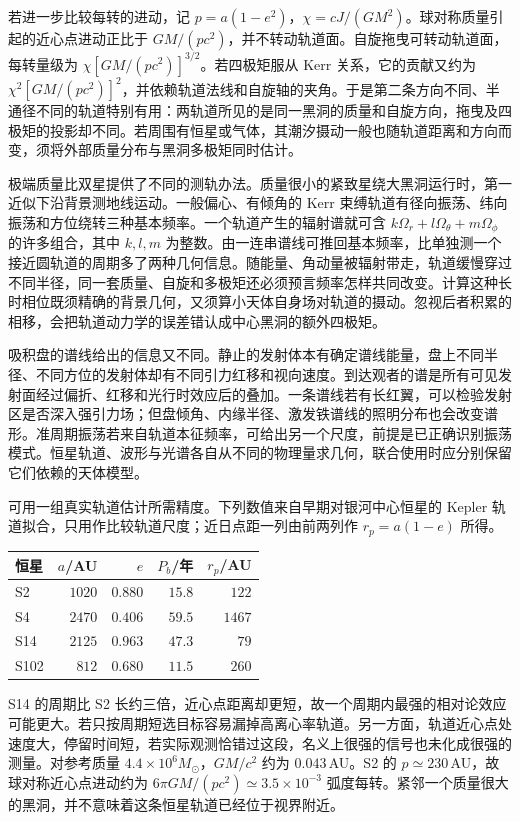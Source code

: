 若进一步比较每转的进动，记 $p=a(1-e^2)$，$\chi=cJ/(GM^2)$。球对称质量引起的近心点进动正比于 $GM/(pc^2)$，并不转动轨道面。自旋拖曳可转动轨道面，每转量级为 $\chi[GM/(pc^2)]^{3/2}$。若四极矩服从 Kerr 关系，它的贡献又约为 $\chi^2[GM/(pc^2)]^2$，并依赖轨道法线和自旋轴的夹角。于是第二条方向不同、半通径不同的轨道特别有用：两轨道所见的是同一黑洞的质量和自旋方向，拖曳及四极矩的投影却不同。若周围有恒星或气体，其潮汐摄动一般也随轨道距离和方向而变，须将外部质量分布与黑洞多极矩同时估计。

极端质量比双星提供了不同的测轨办法。质量很小的紧致星绕大黑洞运行时，第一近似下沿背景测地线运动。一般偏心、有倾角的 Kerr 束缚轨道有径向振荡、纬向振荡和方位绕转三种基本频率。一个轨道产生的辐射谱就可含 $k\Omega_r+l\Omega_\theta+m\Omega_\phi$ 的许多组合，其中 $k,l,m$ 为整数。由一连串谱线可推回基本频率，比单独测一个接近圆轨道的周期多了两种几何信息。随能量、角动量被辐射带走，轨道缓慢穿过不同半径，同一套质量、自旋和多极矩还必须预言频率怎样共同改变。计算这种长时相位既须精确的背景几何，又须算小天体自身场对轨道的摄动。忽视后者积累的相移，会把轨道动力学的误差错认成中心黑洞的额外四极矩。

吸积盘的谱线给出的信息又不同。静止的发射体本有确定谱线能量，盘上不同半径、不同方位的发射体却有不同引力红移和视向速度。到达观者的谱是所有可见发射面经过偏折、红移和光行时效应后的叠加。一条谱线若有长红翼，可以检验发射区是否深入强引力场；但盘倾角、内缘半径、激发铁谱线的照明分布也会改变谱形。准周期振荡若来自轨道本征频率，可给出另一个尺度，前提是已正确识别振荡模式。恒星轨道、波形与光谱各自从不同的物理量求几何，联合使用时应分别保留它们依赖的天体模型。

可用一组真实轨道估计所需精度。下列数值来自早期对银河中心恒星的 Kepler 轨道拟合，只用作比较轨道尺度；近日点距一列由前两列作 $r_p=a(1-e)$ 所得。
\begin{center}
\begin{tabular}{lrrrr}
\hline
恒星 & $a$/AU & $e$ & $P_b$/年 & $r_p$/AU\\ \hline
S2   & $1020$ & $0.880$ & $15.8$ & $122$\\
S4   & $2470$ & $0.406$ & $59.5$ & $1467$\\
S14  & $2125$ & $0.963$ & $47.3$ & $79$\\
S102 & $812$  & $0.680$ & $11.5$ & $260$\\ \hline
\end{tabular}
\end{center}
S14 的周期比 S2 长约三倍，近心点距离却更短，故一个周期内最强的相对论效应可能更大。若只按周期短选目标容易漏掉高离心率轨道。另一方面，轨道近心点处速度大，停留时间短，若实际观测恰错过这段，名义上很强的信号也未化成很强的测量。对参考质量 $4.4\times10^6M_\odot$，$GM/c^2$ 约为 $0.043$\,AU。S2 的 $p\simeq230$\,AU，故球对称近心点进动约为 $6\pi GM/(pc^2)\simeq3.5\times10^{-3}$ 弧度每转。紧邻一个质量很大的黑洞，并不意味着这条恒星轨道已经位于视界附近。


